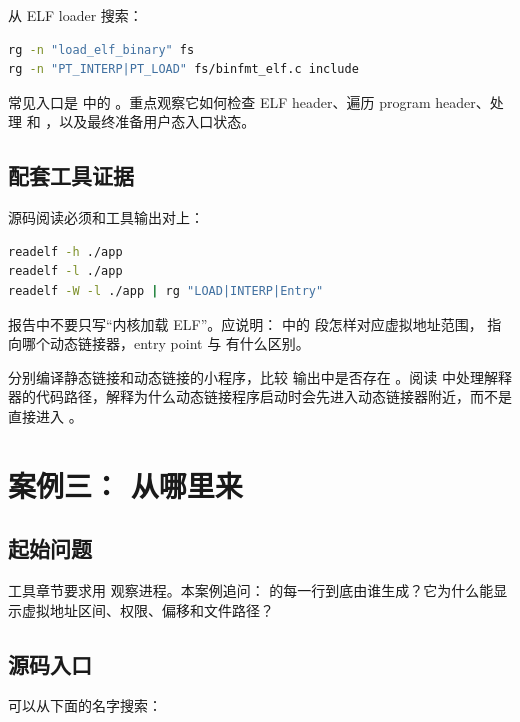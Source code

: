 从 ELF loader 搜索：

\begin{lstlisting}[language=bash]
rg -n "load_elf_binary" fs
rg -n "PT_INTERP|PT_LOAD" fs/binfmt_elf.c include
\end{lstlisting}

常见入口是  中的 。重点观察它如何检查 ELF header、遍历 program header、处理  和 ，以及最终准备用户态入口状态。

\subsection{配套工具证据}

源码阅读必须和工具输出对上：

\begin{lstlisting}[language=bash]
readelf -h ./app
readelf -l ./app
readelf -W -l ./app | rg "LOAD|INTERP|Entry"
\end{lstlisting}

报告中不要只写“内核加载 ELF”。应说明： 中的  段怎样对应虚拟地址范围， 指向哪个动态链接器，entry point 与  有什么区别。

\begin{labbox}
分别编译静态链接和动态链接的小程序，比较  输出中是否存在 。阅读  中处理解释器的代码路径，解释为什么动态链接程序启动时会先进入动态链接器附近，而不是直接进入 。
\end{labbox}

\section{案例三： 从哪里来}

\subsection{起始问题}

工具章节要求用  观察进程。本案例追问： 的每一行到底由谁生成？它为什么能显示虚拟地址区间、权限、偏移和文件路径？

\subsection{源码入口}

可以从下面的名字搜索：

